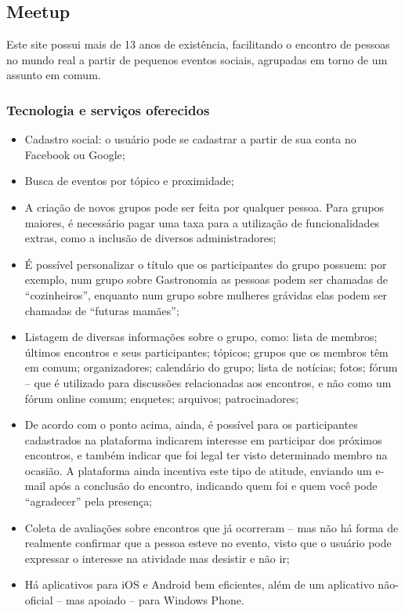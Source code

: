 \documentclass[12pt,a4paper,twoside,hyphens,english,brazil]{abntex2}
\begin{document}
\subsection{Meetup}
Este site possui mais de 13 anos de existência, facilitando o encontro de pessoas no mundo real a partir de pequenos eventos sociais, agrupadas em torno de um assunto em comum.

\subsubsection*{Tecnologia e serviços oferecidos}
\begin{itemize}[itemsep=-1ex]
	\item Cadastro social: o usuário pode se cadastrar a partir de sua conta no Facebook ou Google;
	\item Busca de eventos por tópico e proximidade;
	\item A criação de novos grupos pode ser feita por qualquer pessoa. Para grupos maiores, é necessário pagar uma taxa para a utilização de funcionalidades extras, como a inclusão de diversos administradores;
	\item É possível personalizar o título que os participantes do grupo possuem: por exemplo, num grupo sobre Gastronomia as pessoas podem ser chamadas de ``cozinheiros'', enquanto num grupo sobre mulheres grávidas elas podem ser chamadas de ``futuras mamães'';
	\item Listagem de diversas informações sobre o grupo, como: lista de membros; últimos encontros e seus participantes; tópicos; grupos que os membros têm em comum; organizadores; calendário do grupo; lista de notícias; fotos; fórum -- que é utilizado para discussões relacionadas aos encontros, e não como um fórum online comum; enquetes; arquivos; patrocinadores;
	\item De acordo com o ponto acima, ainda, é possível para os participantes cadastrados na plataforma indicarem interesse em participar dos próximos encontros, e também indicar que foi legal ter visto determinado membro na ocasião. A plataforma ainda incentiva este tipo de atitude, enviando um e-mail após a conclusão do encontro, indicando quem foi e quem você pode ``agradecer'' pela presença;
	\item Coleta de avaliações sobre encontros que já ocorreram -- mas não há forma de realmente confirmar que a pessoa esteve no evento, visto que o usuário pode expressar o interesse na atividade mas desistir e não ir;
	\item Há aplicativos para iOS e Android bem eficientes, além de um aplicativo não-oficial -- mas apoiado -- para Windows Phone.
\end{itemize}
\end{document}
